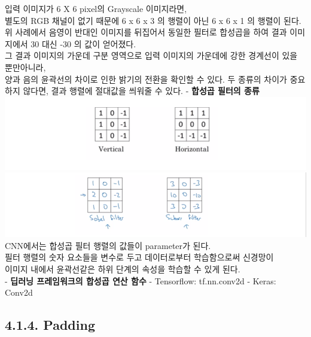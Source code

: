 \documentclass[11pt]{article}
\makeatletter
\def\maxwidth{\ifdim\Gin@nat@width>\linewidth\linewidth
    \else\Gin@nat@width\fi}
\let\Oldincludegraphics\includegraphics
\renewcommand{\includegraphics}[1]{\Oldincludegraphics[width=.8\maxwidth]{#1}}
\makeatother
\begin{document}
입력 이미지가 6 X 6 pixel의 Grayscale 이미지라면,\\
별도의 RGB 채널이 없기 때문에 6 x 6 x 3 의 행렬이 아닌 6 x 6 x 1 의
행렬이 된다.\\
위 사례에서 음영이 반대인 이미지를 뒤집어서 동일한 필터로 합성곱을 하여
결과 이미지에서 30 대신 -30 의 값이 얻어졌다.\\
그 결과 이미지의 가운데 구분 영역으로 입력 이미지의 가운데에 강한
경계선이 있을 뿐만아니라,\\
양과 음의 윤곽선의 차이로 인한 밝기의 전환을 확인할 수 있다. 두 종류의
차이가 중요하지 않다면, 결과 행렬에 절대값을 씌워줄 수 있다. -
\textbf{합성곱 필터의 종류} \includegraphics{./Images/c4week1/4-1-1.png}
\includegraphics{./Images/c4week1/4-0-2.png} CNN에서는 합성곱 필터
행렬의 값들이 parameter가 된다.\\
필터 행렬의 숫자 요소들을 변수로 두고 데이터로부터 학습함으로써
신경망이\\
이미지 내에서 윤곽선같은 하위 단계의 속성을 학습할 수 있게 된다.\\
 - \textbf{딥러닝 프레임워크의 합성곱 연산 함수} - Tensorflow:
tf.nn.conv2d - Keras: Conv2d

 

    \subsection{4.1.4. Padding}\label{padding}
\end{document}
